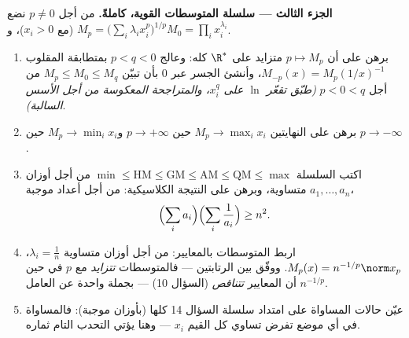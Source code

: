 \begin{problem}
\medskip
\noindent\textbf{الجزء الثالث --- سلسلة المتوسطات القوية، كاملةً.}
من أجل $p \neq 0$ نضع $M_p = \bigl(\sum_i\lambda_i
x_i^p\bigr)^{1/p}$ (مع $x_i > 0$)، و$M_0 = \prod_i
x_i^{\lambda_i}$.
\begin{enumerate}[resume]
  \item برهن على أن $p \mapsto M_p$ متزايد على $\R^*$ كله:
        وعالج $p < q < 0$ بمتطابقة المقلوب
        $M_{-p}(x) = M_p(1/x)^{-1}$، وأنشئ الجسر عبر $0$ بأن
        تبيّن $M_p \leq M_0 \leq M_q$ من أجل $p < 0 < q$
        \emph{(طبّق تقعّر $\ln$ على $x_i^q$، والمتراجحة
        المعكوسة من أجل الأسس السالبة)}.
  \item برهن على النهايتين $M_p \to \max_i x_i$ حين $p \to
        +\infty$ و$M_p \to \min_i x_i$ حين $p \to -\infty$.
  \item اكتب السلسلة $\min \leq \mathrm{HM} \leq
        \mathrm{GM} \leq \mathrm{AM} \leq \mathrm{QM} \leq
        \max$ من أجل أوزان متساوية، وبرهن على النتيجة
        الكلاسيكية: من أجل أعداد موجبة $a_1, \dots, a_n$،
        \[
        \Bigl(\sum_i a_i\Bigr)\Bigl(\sum_i\frac1{a_i}\Bigr)
        \geq n^2 .
        \]
  \item اربط المتوسطات بالمعايير: من أجل أوزان متساوية $\lambda_i =
        \frac1n$، $M_p(x) = n^{-1/p}\norm x_p$. ووفّق بين
        الرتابتين --- فالمتوسطات \emph{تتزايد} مع $p$
        في حين أن المعايير \emph{تتناقص} (السؤال 10) --- بجملة
        واحدة عن العامل $n^{-1/p}$.
  \item عيّن حالات المساواة على امتداد سلسلة
        السؤال 14 كلها (بأوزان موجبة): فالمساواة في أي موضع
        تفرض تساوي كل القيم $x_i$ --- وهنا يؤتي التحدب التام ثماره.
\end{enumerate}


\end{problem}
